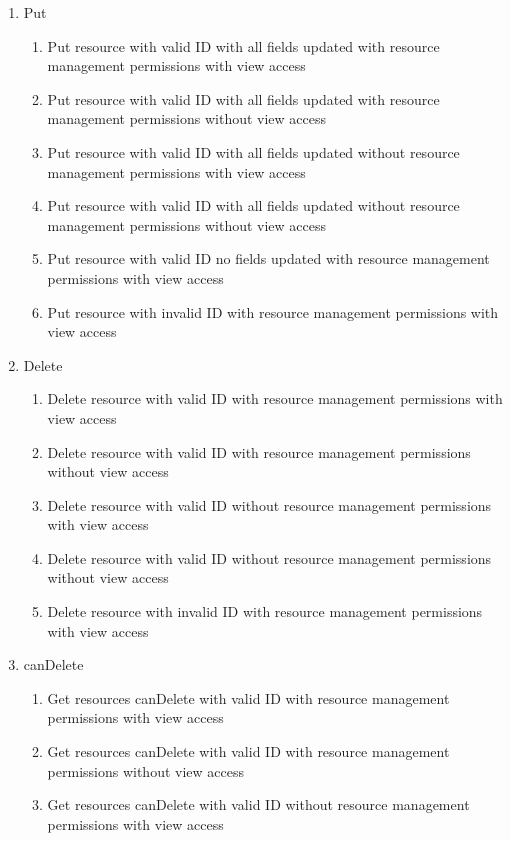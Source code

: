 \documentclass[12pt]{article}
\begin{document}
\begin{enumerate}
\begin{enumerate}
\begin{enumerate}
        \end{enumerate}
        \item Put
        \begin{enumerate}
            \item Put resource with valid ID with all fields updated with resource management permissions with view access
            \item Put resource with valid ID with all fields updated with resource management permissions without view access
            \item Put resource with valid ID with all fields updated without resource management permissions with view access
            \item Put resource with valid ID with all fields updated without resource management permissions without view access
            \item Put resource with valid ID no fields updated with resource management permissions with view access
            \item Put resource with invalid ID with resource management permissions with view access
        \end{enumerate}
        \item Delete
        \begin{enumerate}
            \item Delete resource with valid ID with resource management permissions with view access
            \item Delete resource with valid ID with resource management permissions without view access
            \item Delete resource with valid ID without resource management permissions with view access
            \item Delete resource with valid ID without resource management permissions without view access
            \item Delete resource with invalid ID with resource management permissions with view access
        \end{enumerate}
        \item canDelete
            \begin{enumerate}
            \item Get resources canDelete with valid ID with resource management permissions with view access
            \item Get resources canDelete with valid ID with resource management permissions without view access
            \item Get resources canDelete with valid ID without resource management permissions with view access

\end{enumerate}
\end{enumerate}
\end{enumerate}
\end{document}
